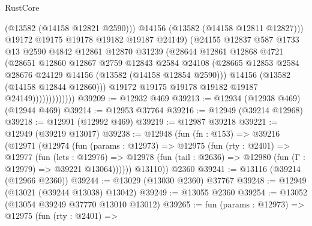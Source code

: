 \begin{lexlean}{RustCore}
\begin{coremodule}
                                (@13582 (@14158 @12821 @2590)))
                              @14156
                              (@13582 (@14158 @12811 @12827)))
                            @19172
                            @19175
                            @19178
                            @19182
                            @19187
                            @24149)
                          (@24155
                            @12837
                            @587
                            @1733
                            @13
                            @2590
                            @4842
                            @12861
                            @12870
                            @31239
                            (@28644
                              @12861
                              @12868
                              @4721
                              (@28651
                                @12860
                                @12867
                                @2759
                                @12843
                                @2584
                                @24108
                                (@28665
                                  @12853
                                  @2584
                                  @28676
                                  @24129
                                  @14156
                                  (@13582 (@14158 @12854 @2590)))
                                @14156
                                (@13582 (@14158 @12844 @12860)))
                              @19172
                              @19175
                              @19178
                              @19182
                              @19187
                              @24149)))))))))))))
@39209 := @12932 @469
@39213 := @12934 (@12938 @469) (@12944 @469)
@39214 := @12953 @37764
@39216 := @12949 (@39214 @12968)
@39218 := @12991 (@12992 @469)
@39219 := @12987 @39218
@39221 := @12949 (@39219 @13017)
@39238 := @12948
    (fun (fn : @153) =>
    @39216
      (@12971
        (@12974
          (fun (params : @12973) =>
          @12975
            (fun (rty : @2401) =>
            @12977
              (fun (lets : @12976) =>
              @12978 (fun (tail : @2636) => @12980 (fun (Γ : @12979) => @39221 @13064))))))
        @13110))
    @2360
@39241 := @13116 (@39214 (@12966 @2360))
@39244 := @13029 (@13030 @2360) @37767
@39248 := @12949 (@13021 (@39244 @13038) @13042)
@39249 := @13055 @2360
@39254 := @13052 (@13054 @39249 @37770 @13010 @13012)
@39265 := fun (params : @12973) =>
  @12975
    (fun (rty : @2401) =>

\end{coremodule}
\end{lexlean}
